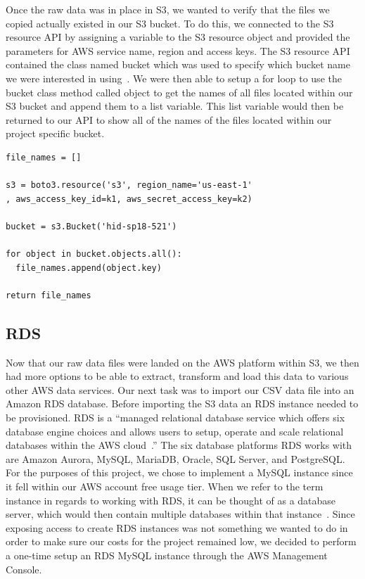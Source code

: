 Once the raw data was in place in S3, we wanted to verify that the files we 
copied actually existed in our S3 bucket. To do this, we connected to the S3 
resource API by assigning a variable to the S3 resource object and provided 
the parameters for AWS service name, region and access keys. The S3 resource 
API contained the class named bucket which was used to specify which bucket 
name we were interested in using~\cite{hid-sp18-521-boto-bucket}. We were then 
able to setup a for loop to use the bucket class method called object to get 
the names of all files located within our S3 bucket and append them to a list 
variable. This list variable would then be returned to our API to show all of 
the names of the files located within our project specific bucket. 

\begin{verbatim}
file_names = []

s3 = boto3.resource('s3', region_name='us-east-1'
, aws_access_key_id=k1, aws_secret_access_key=k2)

bucket = s3.Bucket('hid-sp18-521')

for object in bucket.objects.all():
  file_names.append(object.key)

return file_names
\end{verbatim}

\subsection{RDS}

Now that our raw data files were landed on the AWS platform within S3, we then 
had more options to be able to extract, transform and load this data to 
various other AWS data services. Our next task was to import our CSV data 
file into an Amazon RDS database. Before importing the S3 data an RDS instance 
needed to be provisioned. RDS is a ``managed relational database service which 
offers six database engine choices and allows users to setup, operate and 
scale relational databases within the AWS 
cloud~\cite{hid-sp18-521-rds-mysql}.'' The six database platforms RDS works 
with are Amazon Aurora, MySQL, MariaDB, Oracle, SQL Server, and PostgreSQL. 
For the purposes of this project, we chose to implement a MySQL instance since 
it fell within our AWS account free usage tier. When we refer to the term 
instance in regards to working with RDS, it can be thought of as a database 
server, which would then contain multiple databases within that 
instance~\cite{hid-sp18-521-rds-mysql}. Since exposing access to create RDS 
instances was not something we wanted to do in order to make sure our costs 
for the project remained low, we decided to perform a one-time setup an RDS 
MySQL instance through the AWS Management Console.  

